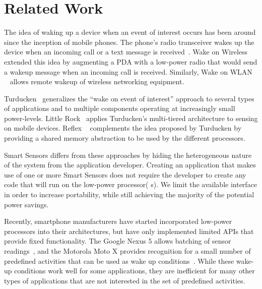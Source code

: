 \section{Related Work}\label{sec:related}

The idea of waking up a device when an event of interest occurs has been 
around since the inception of mobile phones. The phone's radio 
transceiver wakes up the device when an incoming call or a text message 
is received~\cite{gobi}. Wake on Wireless~\cite{shih2002wake} extended this idea by 
augmenting a PDA with a low-power radio that would send a wakeup message 
when an incoming call is received. Similarly, Wake on WLAN
~\cite{mishra2006wake} allows remote wakeup of wireless networking
equipment.

Turducken~\cite{turducken} generalizes the ``wake on event of interest'' 
approach to several types of applications and to multiple components 
operating at increasingly small power-levels. Little Rock~\cite{littlerock} 
applies Turducken's multi-tiered architecture to sensing on mobile 
devices. Reflex ~\cite{reflex} complements the idea proposed by Turducken 
by providing a shared memory abstraction to be used by the different 
processors.

Smart Sensors differs from these approaches by hiding the heterogeneous 
nature of the system from the application developer. Creating an 
application that makes use of one or more Smart Sensors does not require 
the developer to create any code that will run on the low-power processor(
s). We limit the available interface in order to increase portability, 
while still achieving the majority of the potential power savings.

Recently, smartphone manufacturers have started incorporated low-power 
processors into their architectures, but have only implemented limited 
APIs that provide fixed functionality. The Google Nexus 5 allows batching 
of sensor readings~\cite{ android4.4,nexus5}, and the Motorola Moto X 
provides recognition for a small number of predefined activities that can 
be used as wake up conditions~\cite{motox}. While these wake-up 
conditions work well for some applications, they are inefficient for many 
other types of applications that are not interested in the set of 
predefined activities.

